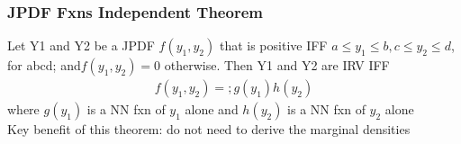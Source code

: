 \documentclass[12pt]{article}
\begin{document}
	\subsubsection{JPDF Fxns Independent Theorem}
		Let Y1 and Y2 be a JPDF $ f(y_1, y_2) $ that is positive IFF
		$ a\le y_1\le b, c\le y_2\le d $, for abcd; and$ f(y_1, y_2)= 0 $
		otherwise. Then Y1 and Y2 are IRV IFF
		\begin{align*}
			f(y_1, y_2) = ;g(y_1)h(y_2)
		\end{align*}
		where $ g(y_1) $ is a NN fxn of $ y_1 $ alone and $ h(y_2) $
		is a NN fxn of $ y_2 $ alone\\
		Key benefit of this theorem: do not need to derive the 
		marginal densities
\end{document}
